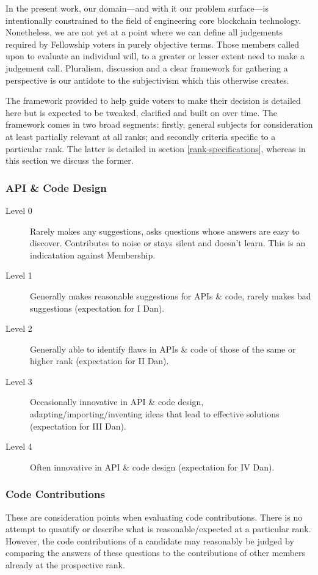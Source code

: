 \documentclass[9pt,oneside]{amsart}
\begin{document}
In the present work, our domain---and with it our problem surface---is intentionally constrained to the field of engineering core blockchain technology. Nonetheless, we are not yet at a point where we can define all judgements required by Fellowship voters in purely objective terms. Those members called upon to evaluate an individual will, to a greater or lesser extent need to make a judgement call. Pluralism, discussion and a clear framework for gathering a perspective is our antidote to the subjectivism which this otherwise creates.

The framework provided to help guide voters to make their decision is detailed here but is expected to be tweaked, clarified and built on over time. The framework comes in two broad segments: firstly, general subjects for consideration at least partially relevant at all ranks; and secondly criteria specific to a particular rank. The latter is detailed in section \ref{rank-specifications}, whereas in this section we discuss the former.

\subsubsection{API \& Code Design}

\begin{description}
  \item[Level 0] Rarely makes any suggestions, asks questions whose answers are easy to discover. Contributes to noise or stays silent and doesn't learn. This is an indicatation against Membership.
  \item[Level 1] Generally makes reasonable suggestions for APIs \& code, rarely makes bad suggestions (expectation for I Dan).
  \item[Level 2] Generally able to identify flaws in APIs \& code of those of the same or higher rank (expectation for II Dan).
  \item[Level 3] Occasionally innovative in API \& code design, adapting/importing/inventing ideas that lead to effective solutions (expectation for III Dan).
  \item[Level 4] Often innovative in API \& code design (expectation for IV Dan).
\end{description}

\subsubsection{Code Contributions}

These are consideration points when evaluating code contributions. There is no attempt to quantify or describe what is reasonable/expected at a particular rank. However, the code contributions of a candidate may reasonably be judged by comparing the answers of these questions to the contributions of other members already at the prospective rank.
\end{document}
